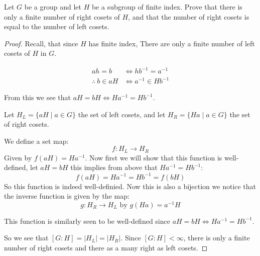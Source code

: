     \begin{exercise}
        Let $G$ be a group and let $H$ be a subgroup of finite index. Prove that there is only a finite number of right cosets of $H$, and that the number of right cosets is equal to the number of left cosets.
    \begin{proof}
        Recall, that since $H$ has finite index, There are only a finite number of left cosets of $H$ in $G$.

        \begin{align*}
            ah = b &\iff hb^{-1} = a^{-1}\\
            \therefore \ b\in aH &\iff  a^{-1}\in Hb^{-1}
        \end{align*}

        From this we see that $aH = bH \iff Ha^{-1} = Hb^{-1}$. 

        Let $H_L = \{aH\mid a\in G\}$ the set of left cosets, and let $H_R = \{Ha \mid a\in G\}$ the set of right cosets.

        We define a set map:\[f\colon H_L\rightarrow H_R\] Given by $f(aH) = Ha^{-1}$. Now first we will show that this function is well-defined, let $aH = bH$ this implies from above that $Ha^{-1} = Hb^{-1}$:\begin{equation*}
            f(aH) = Ha^{-1} = Hb^{-1} = f(bH)
        \end{equation*} 
        So this function is indeed well-definied. Now this is also a bijection we notice that the inverse function is given by the map:\[g\colon H_R\rightarrow H_L \text{ by }g(Ha) = a^{-1}H \]
    
        This function is similarly seen to be well-defined since $aH = bH \iff Ha^{-1} = Hb^{-1}$. 

        So we see that $[G\colon H] = |H_L| = |H_R|$. Since $[G\colon H]<\infty$, there is only a finite number of right cosets and there as a many right as left cosets.
    \end{proof}
    \end{exercise}

